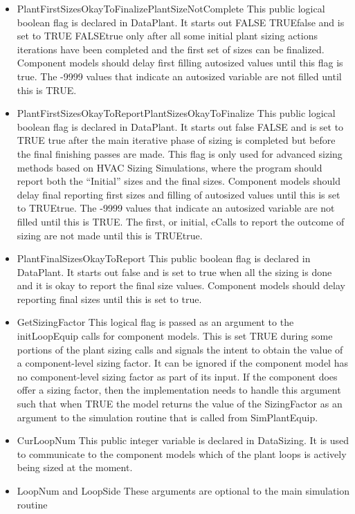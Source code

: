 \begin{itemize}
\item
  PlantFirstSizesOkayToFinalizePlantSizeNotComplete This public logical boolean flag is declared in DataPlant. It starts out FALSE TRUEfalse and is set to TRUE FALSEtrue only after all some initial plant sizing actions iterations have been completed and the first set of sizes can be finalized. Component models should delay first filling autosized values until this flag is true. The -9999 values that indicate an autosized variable are not filled until this is TRUE.
\item
  PlantFirstSizesOkayToReportPlantSizesOkayToFinalize This public logical boolean flag is declared in DataPlant. It starts out false FALSE and is set to TRUE true after the main iterative phase of sizing is completed but before the final finishing passes are made. This flag is only used for advanced sizing methods based on HVAC Sizing Simulations, where the program should report both the ``Initial'' sizes and the final sizes. Component models should delay final reporting first sizes and filling of autosized values until this is set to TRUEtrue. The -9999 values that indicate an autosized variable are not filled until this is TRUE. The first, or initial, cCalls to report the outcome of sizing are not made until this is TRUEtrue.
\item
  PlantFinalSizesOkayToReport This public boolean flag is declared in DataPlant. It starts out false and is set to true when all the sizing is done and it is okay to report the final size values. Component models should delay reporting final sizes until this is set to true.
\item
  GetSizingFactor This logical flag is passed as an argument to the initLoopEquip calls for component models. This is set TRUE during some portions of the plant sizing calls and signals the intent to obtain the value of a component-level sizing factor. It can be ignored if the component model has no component-level sizing factor as part of its input. If the component does offer a sizing factor, then the implementation needs to handle this argument such that when TRUE the model returns the value of the SizingFactor as an argument to the simulation routine that is called from SimPlantEquip.
\item
  CurLoopNum This public integer variable is declared in DataSizing. It is used to communicate to the component models which of the plant loops is actively being sized at the moment.
\item
  LoopNum and LoopSide These arguments are optional to the main simulation routine
\end{itemize}

